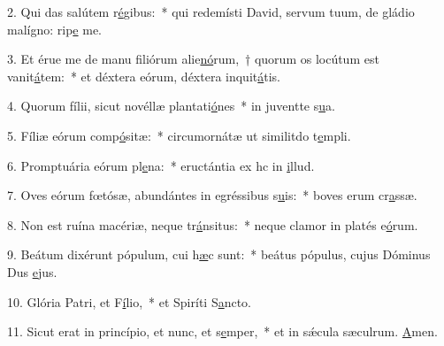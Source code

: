 2. Qui das salútem r\uline{é}gibus:~* qui redemísti David, servum tuum, de gládio malígno: rip\uline{e} me.\par 
3. Et érue me de manu filiórum alie\uline{nó}rum,~† quorum os locútum est vanit\uline{á}tem:~* et déxtera eórum, déxtera inquit\uline{á}tis.\par 
4. Quorum fílii, sicut novéllæ plantati\uline{ó}nes~* in juventte s\uline{u}a.\par 
5. Fíliæ eórum comp\uline{ó}sitæ:~* circumornátæ ut similitdo t\uline{e}mpli.\par 
6. Promptuária eórum pl\uline{e}na:~* eructántia ex hc in \uline{i}llud.\par 
7. Oves eórum fœtósæ, abundántes in egréssibus s\uline{u}is:~* boves erum cr\uline{a}ssæ.\par 
8. Non est ruína macériæ, neque tr\uline{á}nsitus:~* neque clamor in platés e\uline{ó}rum.\par 
9. Beátum dixérunt pópulum, cui h\uline{æ}c sunt:~* beátus pópulus, cujus Dóminus Dus \uline{e}jus.\par 
10. Glória Patri, et F\uline{í}lio,~* et Spiríti S\uline{a}ncto.\par 
11. Sicut erat in princípio, et nunc, et s\uline{e}mper,~* et in sǽcula sæculrum. \uline{A}men.\par 
